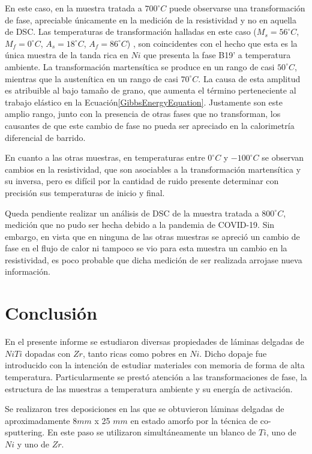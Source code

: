 \documentclass[12pt]{article}
\theoremstyle{definition}
\theoremstyle{remark}
\begin{document}
{En este caso, en la muestra tratada a $700 ^\circ C$ puede observarse una transformación de fase, apreciable únicamente en la medición de la resistividad y no en aquella de DSC. Las temperaturas de transformación halladas en este caso ($M_s = 56 ^\circ C$, $M_f = 0 ^\circ C$, $A_s = 18 ^\circ C$, $A_f = 86 ^\circ C$) , son coincidentes con el hecho que esta es la única muestra de la tanda rica en $Ni$ que presenta la fase B19' a temperatura ambiente. La transformación martensítica se produce en un rango de casi $50 ^\circ C$, mientras que la austenítica en un rango de casi $70^\circ C$. La causa de esta amplitud es atribuible al bajo tamaño de grano, que aumenta el término perteneciente al trabajo elástico en la Ecuación\ref{GibbsEnergyEquation}. Justamente son este amplio rango, junto con la presencia de otras fases que no transforman, los causantes de que este cambio de fase no pueda ser apreciado en la calorimetría diferencial de barrido.

En cuanto a las otras muestras, en temperaturas entre $0 ^\circ C$ y $-100 ^\circ C$ se observan cambios en la resistividad, que son asociables a la transformación martensítica y su inversa, pero es difícil por la cantidad de ruido presente determinar con precisión sus temperaturas de inicio y final.

Queda pendiente realizar un análisis de DSC de la muestra tratada a $800 ^\circ C$, medición que no pudo ser hecha debido a la pandemia de COVID-19. Sin embargo, en vista que en ninguna de las otras muestras se apreció un cambio de fase en el flujo de calor ni tampoco se vio para esta muestra un cambio en la resistividad, es poco probable que dicha medición de ser realizada arrojase nueva información.

\newpage
\section{Conclusión}
En el presente informe se estudiaron diversas propiedades de láminas delgadas de $NiTi$ dopadas con $Zr$, tanto ricas como pobres en $Ni$. Dicho dopaje fue introducido con la intención de estudiar materiales con memoria de forma de alta temperatura. Particularmente se prestó atención a las transformaciones de fase, la estructura de las muestras a temperatura ambiente y su energía de activación. 

Se realizaron tres deposiciones en las que se obtuvieron láminas delgadas de aproximadamente 8$mm$ x 25 $mm$ en estado amorfo por la técnica de co-sputtering. En este paso se utilizaron simultáneamente un blanco de $Ti$, uno de $Ni$ y uno de $Zr$.

}
\end{document}
